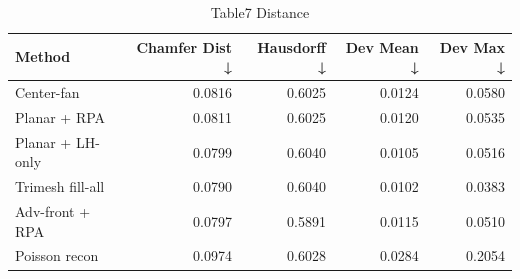 \begin{table}
\caption{Table7 Distance}
\label{tab:table7_distance}
\begin{tabular}{lrrrr}
\toprule
Method & Chamfer Dist ↓ & Hausdorff ↓ & Dev Mean ↓ & Dev Max ↓ \\
\midrule
Center-fan & 0.0816 & 0.6025 & 0.0124 & 0.0580 \\
Planar + RPA & 0.0811 & 0.6025 & 0.0120 & 0.0535 \\
Planar + LH-only & 0.0799 & 0.6040 & 0.0105 & 0.0516 \\
Trimesh fill-all & 0.0790 & 0.6040 & 0.0102 & 0.0383 \\
Adv-front + RPA & 0.0797 & 0.5891 & 0.0115 & 0.0510 \\
Poisson recon & 0.0974 & 0.6028 & 0.0284 & 0.2054 \\
\bottomrule
\end{tabular}
\end{table}
